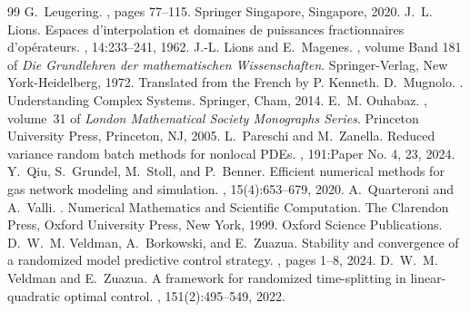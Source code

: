 \documentclass[10pt,a4paper]{amsart}
\begin{document}
\begin{thebibliography}{99}
 G.~Leugering. , pages 77--115. \newblock Springer Singapore, Singapore, 2020.
 J.~L. Lions. \newblock Espaces d'interpolation et domaines de puissances fractionnaires d'op{\'e}rateurs. , 14:233--241, 1962.
 J.-L. Lions and E.~Magenes. , volume Band 181 of {\em Die Grundlehren der mathematischen Wissenschaften}. \newblock Springer-Verlag, New York-Heidelberg, 1972. \newblock Translated from the French by P. Kenneth.
 D.~Mugnolo. . \newblock Understanding Complex Systems. Springer, Cham, 2014.
 E.~M. Ouhabaz. , volume~31 of {\em London Mathematical Society Monographs Series}. \newblock Princeton University Press, Princeton, NJ, 2005.
 L.~Pareschi and M.~Zanella. \newblock Reduced variance random batch methods for nonlocal {PDE}s. , 191:Paper No. 4, 23, 2024.
 Y.~Qiu, S.~Grundel, M.~Stoll, and P.~Benner. \newblock Efficient numerical methods for gas network modeling and simulation. , 15(4):653--679, 2020.
 A.~Quarteroni and A.~Valli. . \newblock Numerical Mathematics and Scientific Computation. The Clarendon Press, Oxford University Press, New York, 1999. \newblock Oxford Science Publications.
 D.~W.~M. Veldman, A.~Borkowski, and E.~Zuazua. \newblock Stability and convergence of a randomized model predictive control strategy. , pages 1--8, 2024.
 D.~W.~M. Veldman and E.~Zuazua. \newblock A framework for randomized time-splitting in linear-quadratic optimal control. , 151(2):495--549, 2022.
\end{thebibliography}
\end{document}
